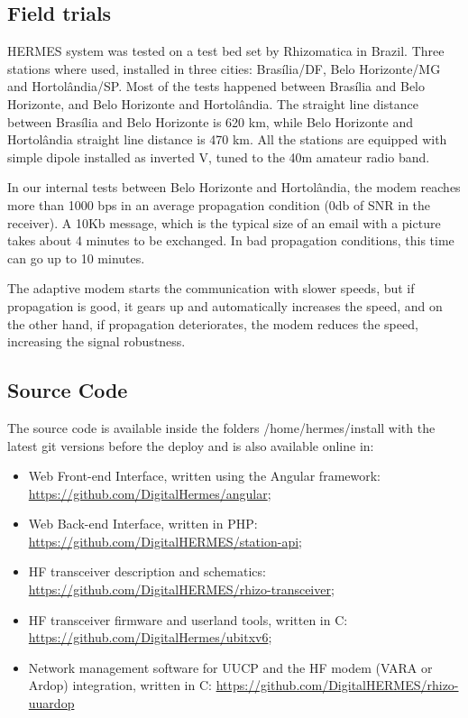 \documentclass[11pt,a4paper]{article}
\begin{document}
\subsection{Field trials}
\label{apx_field_trials}
    HERMES system was tested on a test bed set by Rhizomatica in Brazil. Three stations where used, installed in three cities: Brasília/DF, Belo Horizonte/MG and Hortolândia/SP. Most of the tests happened between Brasília and Belo Horizonte, and Belo Horizonte and Hortolândia. The straight line distance between Brasília and Belo Horizonte is 620 km, while Belo Horizonte and Hortolândia straight line distance is 470 km. All the stations are equipped with simple dipole installed as inverted V, tuned to the 40m amateur radio band.

    In our internal tests between Belo Horizonte and Hortolândia, the modem reaches more than 1000 bps in an average propagation condition (0db of SNR in the receiver). A 10Kb message, which is the typical size of an email with a picture takes about 4 minutes to be exchanged. In bad propagation conditions, this time can go up to 10 minutes. 

    The adaptive modem starts the communication with slower speeds, but if propagation is good, it gears up and automatically increases the speed, and on the other hand, if propagation deteriorates, the modem reduces the speed, increasing the signal robustness.

\subsection{Source Code}
\label{apx_src}

    The source code is available inside the folders /home/hermes/install with the latest git versions before the deploy and is also available online in:
\begin{itemize}
    \item Web Front-end Interface, written using the Angular framework: \url{https://github.com/DigitalHermes/angular};
    \item Web Back-end Interface, written in PHP: \url{https://github.com/DigitalHERMES/station-api}; 
    \item HF transceiver description and schematics: \url{https://github.com/DigitalHERMES/rhizo-transceiver};
    \item HF transceiver firmware and userland tools, written in C:
    \url{https://github.com/DigitalHermes/ubitxv6};
    \item Network management software for UUCP and the HF modem (VARA or Ardop) integration, written in C:
    \url{https://github.com/DigitalHERMES/rhizo-uuardop}
\end{itemize}
\end{document}

